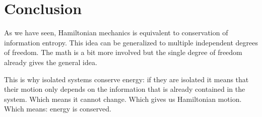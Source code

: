 \documentclass[aps,pra,10pt,floatfix,nofootinbib]{revtex4-1}
\theoremstyle{definition}
\begin{document}
\section{Conclusion}
As we have seen, Hamiltonian mechanics is equivalent to conservation of information entropy. This idea can be generalized to multiple independent degrees of freedom. The math is a bit more involved but the single degree of freedom already gives the general idea.

This is why isolated systems conserve energy: if they are isolated it means that their motion only depends on the information that is already contained in the system. Which means it cannot change. Which gives us Hamiltonian motion. Which means: energy is conserved.
\end{document}
